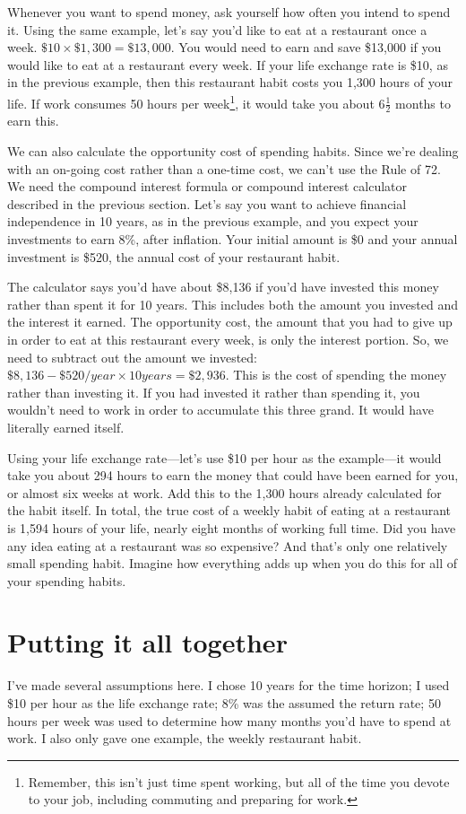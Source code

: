 Whenever you want to spend money, ask yourself how often you intend to spend it. Using the same example, let's say you'd like to eat at a restaurant once a week. $\$10 \times \$1,300 = \$13,000$. You would need to earn and save \$13,000 if you would like to eat at a restaurant every week. If your life exchange rate is \$10, as in the previous example, then this restaurant habit costs you 1,300 hours of your life. If work consumes 50 hours per week\footnote{Remember, this isn't just time spent working, but all of the time you devote to your job, including commuting and preparing for work.}, it would take you about $6\frac{1}{2}$ months to earn this.

We can also calculate the opportunity cost of spending habits. Since we're dealing with an on-going cost rather than a one-time cost, we can't use the Rule of 72. We need the compound interest formula or compound interest calculator described in the previous section. Let's say you want to achieve financial independence in 10 years, as in the previous example, and you expect your investments to earn 8\%, after inflation. Your initial amount is \$0 and your annual investment is \$520, the annual cost of your restaurant habit.

The calculator says you'd have about \$8,136 if you'd have invested this money rather than spent it for 10 years. This includes both the amount you invested and the interest it earned. The opportunity cost, the amount that you had to give up in order to eat at this restaurant every week, is only the interest portion. So, we need to subtract out the amount we invested: $\$8,136 - \$520/year \times 10 years = \$2,936$. This is the cost of spending the money rather than investing it. If you had invested it rather than spending it, you wouldn't need to work in order to accumulate this three grand. It would have literally earned itself.

Using your life exchange rate---let's use \$10 per hour as the example---it would take you about 294 hours to earn the money that could have been earned for you, or almost six weeks at work. Add this to the 1,300 hours already calculated for the habit itself. In total, the true cost of a weekly habit of eating at a restaurant is 1,594 hours of your life, nearly eight months of working full time. Did you have any idea eating at a restaurant was so expensive? And that's only one relatively small spending habit. Imagine how everything adds up when you do this for all of your spending habits.

\section{Putting it all together}
I've made several assumptions here. I chose 10 years for the time horizon; I used \$10 per hour as the life exchange rate; 8\% was the assumed the return rate; 50 hours per week was used to determine how many months you'd have to spend at work. I also only gave one example, the weekly restaurant habit.

